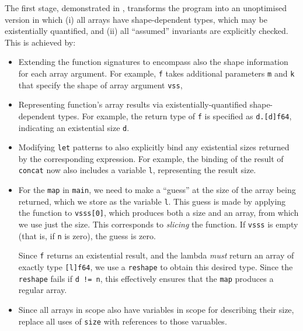 The first stage, demonstrated in , transforms
the program into an unoptimised version in which (i) all arrays have
shape-dependent types, which may be existentially quantified, and (ii)
all ``assumed'' invariants are explicitly checked.
%
This is achieved by:
\begin{itemize}
\item Extending the function signatures to encompass also the shape
  information for each array argument.  For example, \lstinline{f}
  takes additional parameters \lstinline{m} and \lstinline{k} that
  specify the shape of array argument \lstinline{vss},

\item Representing function's array results via
  existentially-quantified shape-dependent types.  For example, the
  return type of \lstinline{f} is specified as
  \lstinline{d.[d]f64}, indicating an existential size \lstinline{d}.

\item Modifying \lstinline{let} patterns to also explicitly bind any
  existential sizes returned by the corresponding expression.  For
  example, the binding of the result of \lstinline{concat} now also
  includes a variable \lstinline{l}, representing the result size.

\item For the \lstinline{map} in \lstinline{main}, we need to make a
  ``guess'' at the size of the array being returned, which we store as
  the variable \lstinline{l}.  This guess is made by applying the
   function to \lstinline{vsss[0]}, which produces both a size
  and an array, from which we use just the size.  This corresponds to
  \textit{slicing} the  function.  If \lstinline{vsss} is
  empty (that is, if \lstinline{n} is zero), the guess is zero.

  Since \lstinline{f} returns an existential result, and the lambda
  \textit{must} return an array of exactly type \lstinline{[l]f64}, we
  use a \lstinline{reshape} to obtain this desired type.  Since the
  \lstinline{reshape} fails if \lstinline{d != n}, this effectively
  ensures that the \lstinline{map} produces a regular array.

\item Since all arrays in scope also have variables in scope for
  describing their size, replace all uses of \lstinline{size} with
  references to those varuables.
\end{itemize}

